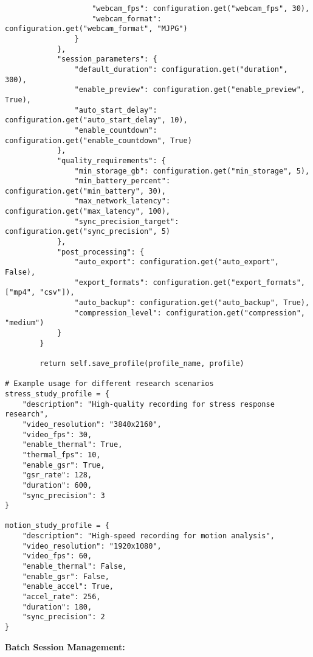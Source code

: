 \documentclass[12pt,a4paper]{article}
\begin{document}
\begin{verbatim}
                    "webcam_fps": configuration.get("webcam_fps", 30),
                    "webcam_format": configuration.get("webcam_format", "MJPG")
                }
            },
            "session_parameters": {
                "default_duration": configuration.get("duration", 300),
                "enable_preview": configuration.get("enable_preview", True),
                "auto_start_delay": configuration.get("auto_start_delay", 10),
                "enable_countdown": configuration.get("enable_countdown", True)
            },
            "quality_requirements": {
                "min_storage_gb": configuration.get("min_storage", 5),
                "min_battery_percent": configuration.get("min_battery", 30),
                "max_network_latency": configuration.get("max_latency", 100),
                "sync_precision_target": configuration.get("sync_precision", 5)
            },
            "post_processing": {
                "auto_export": configuration.get("auto_export", False),
                "export_formats": configuration.get("export_formats", ["mp4", "csv"]),
                "auto_backup": configuration.get("auto_backup", True),
                "compression_level": configuration.get("compression", "medium")
            }
        }
        
        return self.save_profile(profile_name, profile)

# Example usage for different research scenarios
stress_study_profile = {
    "description": "High-quality recording for stress response research",
    "video_resolution": "3840x2160",
    "video_fps": 30,
    "enable_thermal": True,
    "thermal_fps": 10,
    "enable_gsr": True,
    "gsr_rate": 128,
    "duration": 600,
    "sync_precision": 3
}

motion_study_profile = {
    "description": "High-speed recording for motion analysis",
    "video_resolution": "1920x1080", 
    "video_fps": 60,
    "enable_thermal": False,
    "enable_gsr": False,
    "enable_accel": True,
    "accel_rate": 256,
    "duration": 180,
    "sync_precision": 2
}
\end{verbatim}

\textbf{Batch Session Management:}
\end{document}
